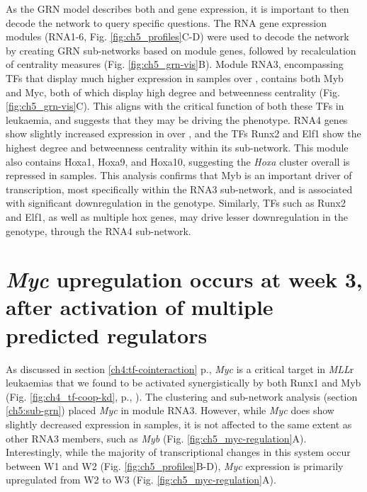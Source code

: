 As the GRN model describes both \mybwt{} and \mybmre{} gene expression, it is important to then decode the network to query specific questions. The RNA gene expression modules (RNA1-6, Fig. \ref{fig:ch5_profiles}C-D) were used to decode the network by creating GRN sub-networks based on module genes, followed by recalculation of centrality measures (Fig. \ref{fig:ch5_grn-vis}B). Module RNA3, encompassing TFs that display much higher expression in \mybwt{} samples over \mybmre{}, contains both Myb and Myc, both of which display high degree and betweenness centrality (Fig. \ref{fig:ch5_grn-vis}C). This aligns with the critical function of both these TFs in leukaemia, and suggests that they may be driving the \mybmre{} phenotype. RNA4 genes show slightly increased expression in \mybwt{} over \mybmre{}, and the TFs Runx2 and Elf1 show the highest degree and betweenness centrality within its sub-network. This module also contains Hoxa1, Hoxa9, and Hoxa10, suggesting the \textit{Hoxa} cluster overall is repressed in \mybmre{} samples. This analysis confirms that Myb is an important driver of transcription, most specifically within the RNA3 sub-network, and is associated with significant downregulation in the \mybmre{} genotype. Similarly, TFs such as Runx2 and Elf1, as well as multiple hox genes, may drive lesser downregulation in the \mybmre{} genotype, through the RNA4 sub-network.


\section{\label{ch5:myc}\textit{Myc} upregulation occurs at week 3, after activation of multiple predicted regulators}

As discussed in section \ref{ch4:tf-cointeraction} p.\pageref{ch4:tf-cointeraction}, \textit{Myc} is a critical target in \textit{MLL}r leukaemias that we found to be activated synergistically by both Runx1 and Myb (Fig. \ref{fig:ch4_tf-coop-kd}, p.\pageref{fig:ch4_tf-coop-kd}, \cite{harman_kmt2a-aff1_2021}). The clustering and sub-network analysis (section \ref{ch5:sub-grn}) placed \textit{Myc} in module RNA3. However, while \textit{Myc} does show slightly decreased expression in \mybmre{} samples, it is not affected to the same extent as other RNA3 members, such as \textit{Myb} (Fig. \ref{fig:ch5_myc-regulation}A). Interestingly, while the majority of transcriptional changes in this system occur between W1 and W2 (Fig. \ref{fig:ch5_profiles}B-D), \textit{Myc} expression is primarily upregulated from W2 to W3 (Fig. \ref{fig:ch5_myc-regulation}A). 


